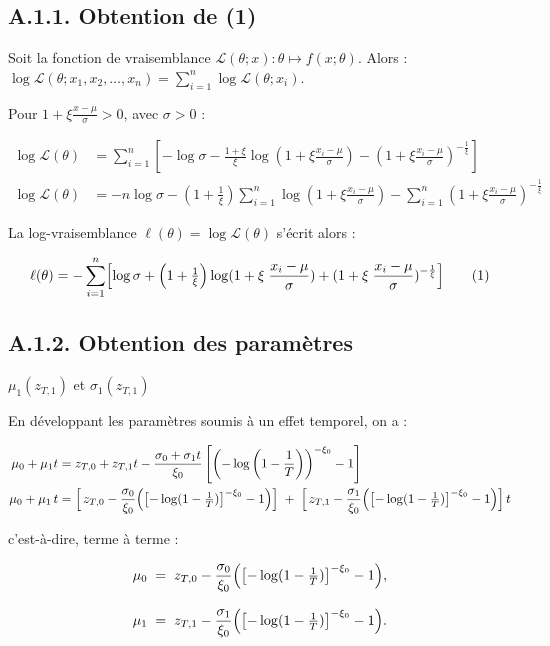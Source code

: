 \documentclass[
  article,
  nofooter,
  noheadings]{jss}
\begin{document}
\subsection*{A.1.1. Obtention de (1)}\label{a.1.1.-obtention-de-1}

Soit la fonction de vraisemblance
\({\displaystyle {\mathcal {L}}(\theta ;x)} : {\displaystyle \theta \mapsto f(x;\theta )}\).
Alors :
\({\displaystyle \log {\mathcal {L}}(\theta ;x_{1},x_{2},\dots ,x_{n})=\sum _{i=1}^{n}\log {\mathcal {L}}(\theta ;x_{i})}\).

Pour \(1 + \xi \frac{x - \mu}{\sigma} > 0\), avec \(\sigma > 0\) :

\[
\begin{aligned}
\log \mathcal{L}(\theta)
&= \sum_{i=1}^n \left[
  -\log \sigma
  - \frac{1 + \xi}{\xi} \log\left(1 + \xi \frac{x_i - \mu}{\sigma} \right)
  - \left(1 + \xi \frac{x_i - \mu}{\sigma} \right)^{-\frac{1}{\xi}}
\right] \\
\log \mathcal{L}(\theta)
&= -n \log \sigma
- \left(1 + \frac{1}{\xi}\right) \sum_{i=1}^n \log\left(1 + \xi \frac{x_i - \mu}{\sigma} \right)
- \sum_{i=1}^n \left(1 + \xi \frac{x_i - \mu}{\sigma} \right)^{-\frac{1}{\xi}}
\end{aligned}
\]

La log-vraisemblance \(\ell(\theta) = \log \mathcal{L}(\theta)\) s'écrit
alors :

\[
\ell(\theta)=
-\sum_{i=1}^n\Bigl[
\log\sigma
+\Bigl(1+\tfrac1{\xi}\Bigr)\log (1+\xi\;\frac{x_i-\mu}{\sigma})
+(1+\xi\;\frac{x_i-\mu}{\sigma})^{-\frac{1}{\xi}}
\Bigr]
\tag{1}
\]

\subsection*{A.1.2. Obtention des
paramètres}\label{a.1.2.-obtention-des-paramuxe8tres}

\(\mu_1(z_{T,1})\) et \(\sigma_1(z_{T,1})\)

En développant les paramètres soumis à un effet temporel, on a :

\[
\begin{aligned}
\mu_0 + \mu_1 t &= z_{T,0} + z_{T,1} t - \dfrac{\sigma_0 + \sigma_1 t}{\xi_0} \left[ \left( -\log\left(1 - \frac{1}{T} \right) \right)^{-\xi_0} - 1 \right]\\
\mu_0+\mu_1\,t &= \Bigl[\,z_{T,0}
-\dfrac{\sigma_0}{\xi_0}\Bigl(\bigl[-\log(1-\tfrac1T)\bigr]^{-\xi_0}-1\Bigr)
\Bigr]\;+\;\Bigl[\,z_{T,1}-\dfrac{\sigma_1}{\xi_0}\Bigl(\bigl[-\log(1-\tfrac1T)\bigr]^{-\xi_0}-1\Bigr)\Bigr]\,t\\
\end{aligned}
\]

c'est-à-dire, terme à terme :

\[
\begin{aligned}
\mu_0 &\;=\; z_{T,0}
-\dfrac{\sigma_0}{\xi_0}\Bigl(\bigl[-\log(1-\tfrac1T)\bigr]^{-\xi_0}-1\Bigr),\\[0.8em]
\mu_1 &\;=\; z_{T,1}
-\dfrac{\sigma_1}{\xi_0}\Bigl(\bigl[-\log(1-\tfrac1T)\bigr]^{-\xi_0}-1\Bigr).
\end{aligned}
\]
\end{document}
